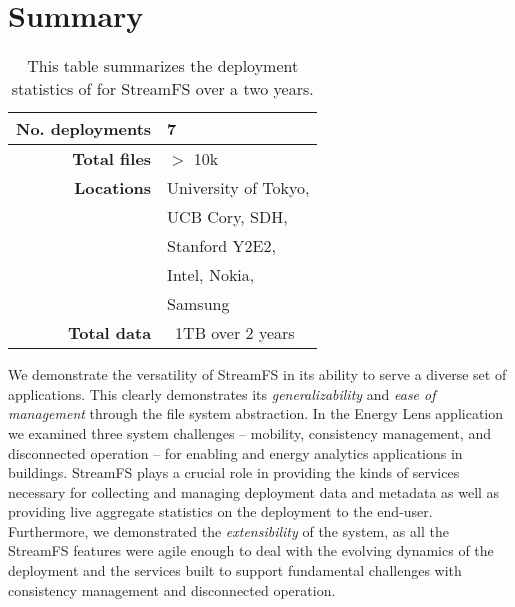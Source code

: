 \section{Summary}

\begin{table}
\begin{center}
  \begin{tabular}{| r | l | }
    \hline
    \textbf{No. deployments}    &   7                       \\ \hline
    \textbf{Total files}        &   $>$ 10k                 \\ \hline
    \textbf{Locations}          &   University of Tokyo,    \\
                                &   UCB Cory, SDH,          \\
                                &   Stanford Y2E2,          \\
                                &   Intel, Nokia,           \\
                                &   Samsung                 \\ \hline
    \textbf{Total data}         &   ~1TB over 2 years       \\  \hline
  \end{tabular}
\caption{This table summarizes the deployment statistics of for StreamFS over a two years.}
\label{tab:sfs_depstats}
\end{center}
\end{table}

We demonstrate the versatility of StreamFS in its ability to serve a diverse set of applications.
This clearly demonstrates its \emph{generalizability}
and \emph{ease of management} through the file system abstraction. %
In the Energy Lens application we examined three system challenges -- mobility, consistency management, and disconnected operation
 -- for enabling and energy 
analytics applications in buildings.  StreamFS plays a crucial role in providing the kinds of services necessary 
for collecting and managing deployment data and metadata as well as providing live aggregate statistics on the deployment
to the end-user.  Furthermore, we demonstrated the \emph{extensibility} of the system, as all the StreamFS
features were agile enough to deal with the evolving dynamics of the deployment and the services built to support
fundamental challenges with consistency management and disconnected operation.


